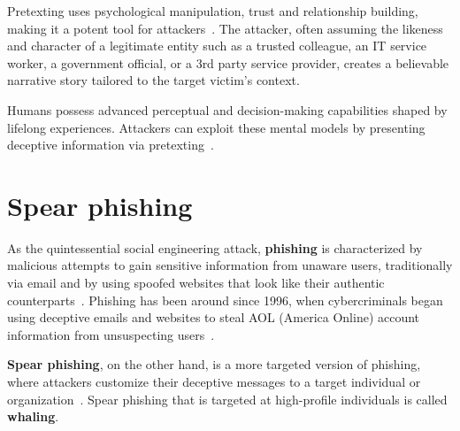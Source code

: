 Pretexting uses psychological manipulation, trust and relationship building, making it a potent tool for attackers~\citep{mitnick_The_Art_of_Deception_2003}. The attacker, often assuming the likeness and character of a legitimate entity such as a trusted colleague, an IT service worker, a government official, or a 3rd party service provider, creates a believable narrative story tailored to the target victim's context.

Humans possess advanced perceptual and decision-making capabilities shaped by lifelong experiences. Attackers can exploit these mental models by presenting deceptive information via pretexting~\citep{mirsky_Threat_Offensive_AI_Organizations_2023}.







\section{Spear phishing}
\begin{comment}

\end{comment}


%
%
As the quintessential social engineering attack, \textbf{phishing} is characterized by malicious attempts to gain sensitive information from unaware users, traditionally via email and by using spoofed websites that look like their authentic counterparts~\citep{basit_Comprehensive_Survey_AI_Phishing_Detection_2021}. Phishing has been around since 1996, when cybercriminals began using deceptive emails and websites to steal AOL (America Online) account information from unsuspecting users~\citep{wang_Defining_Social_Engineering_2020}.



%
%
\textbf{Spear phishing}, on the other hand, is a more targeted version of phishing, where attackers customize their deceptive messages to a target individual or organization~\citep{fakhouri_AI_Driven_Solutions_SE_Attacks_2024}. Spear phishing that is targeted at high-profile individuals is called \textbf{whaling}.


